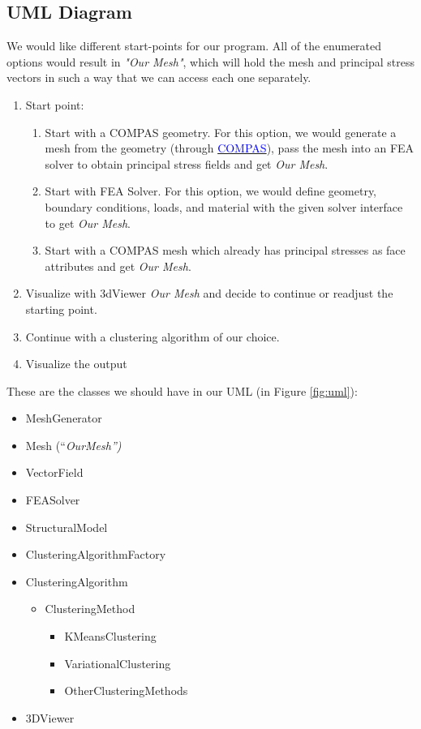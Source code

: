 \documentclass[11pt]{article}
\begin{document}
\subsection{UML Diagram}
We would like different start-points for our program. All of the enumerated options would result in \emph{"Our Mesh"}, which will hold the mesh and principal stress vectors in such a way that we can access each one separately.
\begin{enumerate}
    \item Start point:
    \begin{enumerate}
        \item Start with a COMPAS geometry. \newline
For this option, we would generate a mesh from the geometry (through \href{https://compas.dev/plugins.html}{\textcolor{blue}{COMPAS}}), pass the mesh into an FEA solver to obtain principal stress fields and get \emph{Our Mesh}.
        \item Start with FEA Solver. \newline
For this option, we would define geometry, boundary conditions, loads, and material with the given solver interface to get \emph{Our Mesh}.
        \item Start with a COMPAS mesh which already has principal stresses as face attributes and get \emph{Our Mesh}.
    \end{enumerate}
    
    \item Visualize with 3dViewer \emph{Our Mesh} and decide to continue or readjust the starting point.
    \item Continue with a clustering algorithm of our choice.
    \item Visualize the output
\end{enumerate}

These are the classes we should have in our UML (in Figure \ref{fig:uml}):

\begin{itemize}
    \item MeshGenerator
    \item Mesh (``\emph{OurMesh'')}
    \item VectorField
    \item FEASolver
    \item StructuralModel
    \item ClusteringAlgorithmFactory
    \item ClusteringAlgorithm
    \begin{itemize}
        \item ClusteringMethod
        \begin{itemize}
            \item KMeansClustering
            \item VariationalClustering
            \item OtherClusteringMethods
        \end{itemize}
    \end{itemize}
    \item 3DViewer
\end{itemize}
\end{document}
